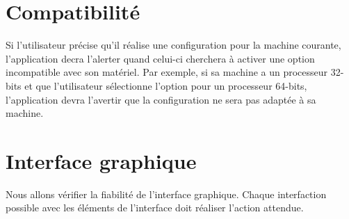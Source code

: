 \documentclass[16pts]{report}
\begin{document}
\section{Compatibilité}
\label{sec:Compatibilité}

Si l'utilisateur précise qu'il réalise une configuration pour la machine
courante, l'application decra l'alerter quand celui-ci cherchera à activer une
option incompatible avec son matériel. Par exemple, si sa machine a un
processeur 32-bits et que l'utilisateur sélectionne l'option pour un processeur
64-bits, l'application devra l'avertir que la configuration ne sera pas adaptée
à sa machine.


\section{Interface graphique}
\label{sec:Interface graphique}

Nous allons vérifier la fiabilité de l'interface graphique. Chaque interfaction
possible avec les éléments de l'interface doit réaliser l'action attendue.
\end{document}
